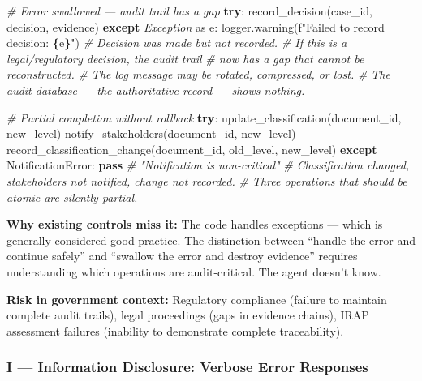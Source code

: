 \documentclass[a4paper,11pt]{report}
\newenvironment{Shaded}{\begin{snugshade}}{\end{snugshade}}
\newcommand{\CommentTok}[1]{\textcolor[rgb]{0.56,0.35,0.01}{\textit{#1}}}
\newcommand{\ControlFlowTok}[1]{\textcolor[rgb]{0.13,0.29,0.53}{\textbf{#1}}}
\newcommand{\ImportTok}[1]{#1}
\newcommand{\NormalTok}[1]{#1}
\newcommand{\PreprocessorTok}[1]{\textcolor[rgb]{0.56,0.35,0.01}{\textit{#1}}}
\newcommand{\SpecialCharTok}[1]{\textcolor[rgb]{0.81,0.36,0.00}{\textbf{#1}}}
\newcommand{\SpecialStringTok}[1]{\textcolor[rgb]{0.31,0.60,0.02}{#1}}
\begin{document}
\begin{Shaded}
\begin{Highlighting}[]
\CommentTok{\# Error swallowed — audit trail has a gap}
\ControlFlowTok{try}\NormalTok{:}
\NormalTok{    record\_decision(case\_id, decision, evidence)}
\ControlFlowTok{except} \PreprocessorTok{Exception} \ImportTok{as}\NormalTok{ e:}
\NormalTok{    logger.warning(}\SpecialStringTok{f"Failed to record decision: }\SpecialCharTok{\{}\NormalTok{e}\SpecialCharTok{\}}\SpecialStringTok{"}\NormalTok{)}
    \CommentTok{\# Decision was made but not recorded.}
    \CommentTok{\# If this is a legal/regulatory decision, the audit trail}
    \CommentTok{\# now has a gap that cannot be reconstructed.}
    \CommentTok{\# The log message may be rotated, compressed, or lost.}
    \CommentTok{\# The audit database — the authoritative record — shows nothing.}

\CommentTok{\# Partial completion without rollback}
\ControlFlowTok{try}\NormalTok{:}
\NormalTok{    update\_classification(document\_id, new\_level)}
\NormalTok{    notify\_stakeholders(document\_id, new\_level)}
\NormalTok{    record\_classification\_change(document\_id, old\_level, new\_level)}
\ControlFlowTok{except}\NormalTok{ NotificationError:}
    \ControlFlowTok{pass}  \CommentTok{\# "Notification is non{-}critical"}
    \CommentTok{\# Classification changed, stakeholders not notified, change not recorded.}
    \CommentTok{\# Three operations that should be atomic are silently partial.}
\end{Highlighting}
\end{Shaded}

\textbf{Why existing controls miss it:} The code handles exceptions ---
which is generally considered good practice. The distinction between
``handle the error and continue safely'' and ``swallow the error and
destroy evidence'' requires understanding which operations are
audit-critical. The agent doesn't know.

\textbf{Risk in government context:} Regulatory compliance (failure to
maintain complete audit trails), legal proceedings (gaps in evidence
chains), IRAP assessment failures (inability to demonstrate complete
traceability).

\hypertarget{i-information-disclosure-verbose-error-responses}{%
\subsubsection{I --- Information Disclosure: Verbose Error
Responses}\label{i-information-disclosure-verbose-error-responses}}
\end{document}
